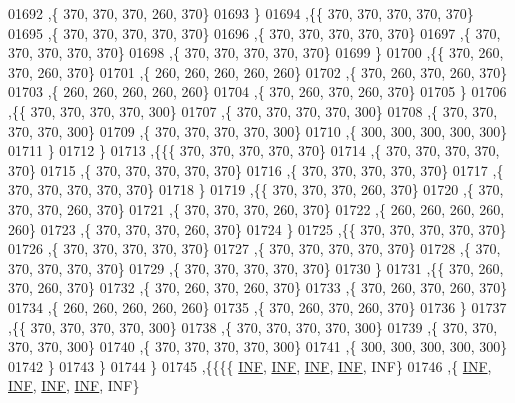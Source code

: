 \begin{DoxyCode}
01692    ,\{   370,   370,   370,   260,   370\}
01693    \}
01694   ,\{\{   370,   370,   370,   370,   370\}
01695    ,\{   370,   370,   370,   370,   370\}
01696    ,\{   370,   370,   370,   370,   370\}
01697    ,\{   370,   370,   370,   370,   370\}
01698    ,\{   370,   370,   370,   370,   370\}
01699    \}
01700   ,\{\{   370,   260,   370,   260,   370\}
01701    ,\{   260,   260,   260,   260,   260\}
01702    ,\{   370,   260,   370,   260,   370\}
01703    ,\{   260,   260,   260,   260,   260\}
01704    ,\{   370,   260,   370,   260,   370\}
01705    \}
01706   ,\{\{   370,   370,   370,   370,   300\}
01707    ,\{   370,   370,   370,   370,   300\}
01708    ,\{   370,   370,   370,   370,   300\}
01709    ,\{   370,   370,   370,   370,   300\}
01710    ,\{   300,   300,   300,   300,   300\}
01711    \}
01712   \}
01713  ,\{\{\{   370,   370,   370,   370,   370\}
01714    ,\{   370,   370,   370,   370,   370\}
01715    ,\{   370,   370,   370,   370,   370\}
01716    ,\{   370,   370,   370,   370,   370\}
01717    ,\{   370,   370,   370,   370,   370\}
01718    \}
01719   ,\{\{   370,   370,   370,   260,   370\}
01720    ,\{   370,   370,   370,   260,   370\}
01721    ,\{   370,   370,   370,   260,   370\}
01722    ,\{   260,   260,   260,   260,   260\}
01723    ,\{   370,   370,   370,   260,   370\}
01724    \}
01725   ,\{\{   370,   370,   370,   370,   370\}
01726    ,\{   370,   370,   370,   370,   370\}
01727    ,\{   370,   370,   370,   370,   370\}
01728    ,\{   370,   370,   370,   370,   370\}
01729    ,\{   370,   370,   370,   370,   370\}
01730    \}
01731   ,\{\{   370,   260,   370,   260,   370\}
01732    ,\{   370,   260,   370,   260,   370\}
01733    ,\{   370,   260,   370,   260,   370\}
01734    ,\{   260,   260,   260,   260,   260\}
01735    ,\{   370,   260,   370,   260,   370\}
01736    \}
01737   ,\{\{   370,   370,   370,   370,   300\}
01738    ,\{   370,   370,   370,   370,   300\}
01739    ,\{   370,   370,   370,   370,   300\}
01740    ,\{   370,   370,   370,   370,   300\}
01741    ,\{   300,   300,   300,   300,   300\}
01742    \}
01743   \}
01744  \}
01745 ,\{\{\{\{   \hyperlink{constants_8h_a12c2040f25d8e3a7b9e1c2024c618cb6}{INF},   \hyperlink{constants_8h_a12c2040f25d8e3a7b9e1c2024c618cb6}{INF},   \hyperlink{constants_8h_a12c2040f25d8e3a7b9e1c2024c618cb6}{INF},   \hyperlink{constants_8h_a12c2040f25d8e3a7b9e1c2024c618cb6}{INF},   INF\}
01746    ,\{   \hyperlink{constants_8h_a12c2040f25d8e3a7b9e1c2024c618cb6}{INF},   \hyperlink{constants_8h_a12c2040f25d8e3a7b9e1c2024c618cb6}{INF},   \hyperlink{constants_8h_a12c2040f25d8e3a7b9e1c2024c618cb6}{INF},   \hyperlink{constants_8h_a12c2040f25d8e3a7b9e1c2024c618cb6}{INF},   INF\}

\end{DoxyCode}
